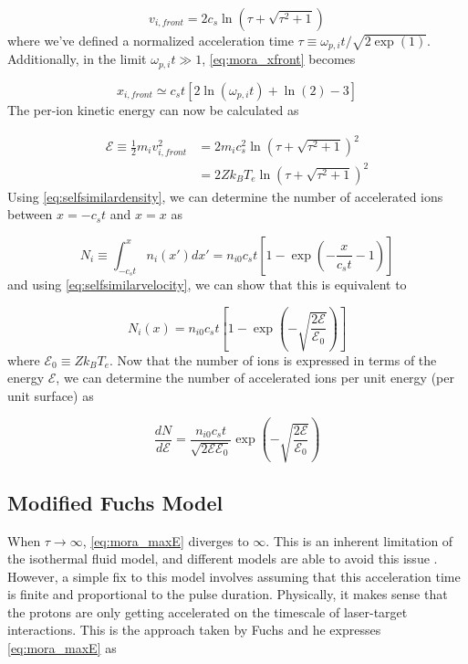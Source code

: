 \begin{equation}
	v_{i,front} = 2 c_s \ln(\tau + \sqrt{\tau^2 + 1})	
\end{equation}
where we've defined a normalized acceleration time $\tau \equiv \omega_{p,i} t / \sqrt{2 \exp(1)}$. Additionally, in the limit $\omega_{p,i} t \gg 1$, \autoref{eq:mora_xfront} becomes

\begin{equation}
	x_{i, front} \simeq c_s t [2 \ln(\omega_{p,i} t) + \ln(2) - 3] \label{eq:mora_xfront_simple}
\end{equation}
The per-ion kinetic energy can now be calculated as

\begin{align}
	\mathcal{E} \equiv \frac{1}{2} m_i v_{i,front}^2 &= 2 m_i c_s^2 \ln(\tau + \sqrt{\tau^2 + 1})^2  \nonumber\\
	&= 2 Z k_B T_{e} \ln(\tau + \sqrt{\tau^2 + 1})^2 \label{eq:mora_maxE}
\end{align}
Using \autoref{eq:selfsimilardensity}, we can determine the number of accelerated ions between $x = -c_s t$ and $x = x$ as

\begin{equation}
	N_i \equiv \int_{-c_s t}^{x} n_i(x') dx' = n_{i0} c_s t [1 - \exp(-\frac{x}{c_s t} - 1)]
\end{equation}
and using \autoref{eq:selfsimilarvelocity}, we can show that this is equivalent to 

\begin{equation}
	N_i(x) = n_{i0} c_s t [1 - \exp(-\sqrt{\frac{2 \mathcal{E}}{\mathcal{E}_0}})] \label{eq:numprotons}
\end{equation}
where $\mathcal{E}_0 \equiv Z k_B T_e$. Now that the number of ions is expressed in terms of the energy $\mathcal{E}$, we can determine the number of accelerated ions per unit energy (per unit surface) as 

\begin{equation}
	\frac{d N}{d \mathcal{E}} = \frac{n_{i0} c_s t}{\sqrt{2 \mathcal{E} \mathcal{E}_0}} \exp(-\sqrt{\frac{2 \mathcal{E}}{\mathcal{E}_0}}) \label{eq:dNdE}
\end{equation}
	
\subsection{Modified Fuchs Model} \label{sec:fuchsv1}

When $\tau \rightarrow \infty$, \cref{eq:mora_maxE} diverges to $\infty$. This is an inherent limitation of the isothermal fluid model, and different models are able to avoid this issue \cite{Mora_2005_PRE,Passoni_2010_NJoP,Schreiber_2006_PRL}. However, a simple fix to this model involves assuming that this acceleration time is finite and proportional to the pulse duration. Physically, it makes sense that the protons are only getting accelerated on the timescale of  laser-target interactions. This is the approach taken by Fuchs \cite{Fuchs_2005_Nat} and he expresses \autoref{eq:mora_maxE} as 

